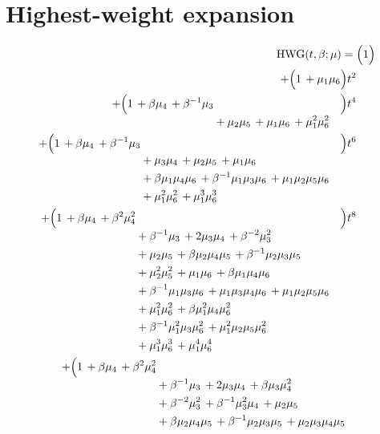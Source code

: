 \documentclass[10pt]{article}
\begin{document}
\section{Highest-weight expansion}
\[
\begin{aligned}
\mathrm{HWG}(t,\beta;\mu) ={}&
   \Bigl(1\Bigr) \\
  + \Bigl(1\,+\mu_1\mu_6\Bigr)t^{2} \\
  + \Bigl(\begin{aligned}[t]1\,+\beta\mu_4\,+\beta^{-1}\mu_3 \\
  &{}+\mu_2\mu_5\,+\mu_1\mu_6\,+\mu_1^{2}\mu_6^{2}\end{aligned}\Bigr)t^{4} \\
  + \Bigl(\begin{aligned}[t]1\,+\beta\mu_4\,+\beta^{-1}\mu_3 \\
  &{}+\mu_3\mu_4\,+\mu_2\mu_5\,+\mu_1\mu_6 \\
  &{}+\beta\mu_1\mu_4\mu_6\,+\beta^{-1}\mu_1\mu_3\mu_6\,+\mu_1\mu_2\mu_5\mu_6 \\
  &{}+\mu_1^{2}\mu_6^{2}\,+\mu_1^{3}\mu_6^{3}\end{aligned}\Bigr)t^{6} \\
  + \Bigl(\begin{aligned}[t]1\,+\beta\mu_4\,+\beta^{2}\mu_4^{2} \\
  &{}+\beta^{-1}\mu_3\,+2\mu_3\mu_4\,+\beta^{-2}\mu_3^{2} \\
  &{}+\mu_2\mu_5\,+\beta\mu_2\mu_4\mu_5\,+\beta^{-1}\mu_2\mu_3\mu_5 \\
  &{}+\mu_2^{2}\mu_5^{2}\,+\mu_1\mu_6\,+\beta\mu_1\mu_4\mu_6 \\
  &{}+\beta^{-1}\mu_1\mu_3\mu_6\,+\mu_1\mu_3\mu_4\mu_6\,+\mu_1\mu_2\mu_5\mu_6 \\
  &{}+\mu_1^{2}\mu_6^{2}\,+\beta\mu_1^{2}\mu_4\mu_6^{2} \\
  &{}+\beta^{-1}\mu_1^{2}\mu_3\mu_6^{2}\,+\mu_1^{2}\mu_2\mu_5\mu_6^{2} \\
  &{}+\mu_1^{3}\mu_6^{3}\,+\mu_1^{4}\mu_6^{4}\end{aligned}\Bigr)t^{8} \\
  + \Bigl(\begin{aligned}[t]1\,+\beta\mu_4\,+\beta^{2}\mu_4^{2} \\
  &{}+\beta^{-1}\mu_3\,+2\mu_3\mu_4\,+\beta\mu_3\mu_4^{2} \\
  &{}+\beta^{-2}\mu_3^{2}\,+\beta^{-1}\mu_3^{2}\mu_4\,+\mu_2\mu_5 \\
  &{}+\beta\mu_2\mu_4\mu_5\,+\beta^{-1}\mu_2\mu_3\mu_5\,+\mu_2\mu_3\mu_4\mu_5 \\

\end{aligned}
\end{aligned}\]
\end{document}
